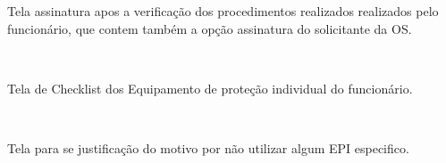 \newpage
Tela assinatura apos a verificação dos procedimentos realizados realizados pelo funcionário, que contem também a opção assinatura do solicitante da OS.

\begin{figure}[htb]
	\centering
	\mbox{%
		\qquad
	}
	
\end{figure}
\newpage
Tela de Checklist dos Equipamento de proteção individual do funcionário.

\begin{figure}[htb]
	\centering
	\mbox{%
		\qquad
	}
	
\end{figure}
\newpage
Tela para se justificação do motivo por não utilizar algum EPI especifico.

